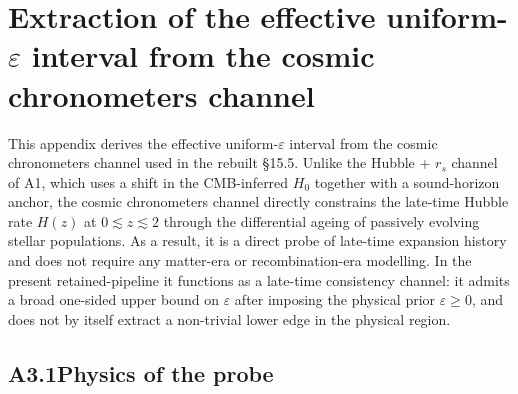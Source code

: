 %
%
%
%

\section{Extraction of the effective uniform-$\varepsilon$ interval
from the cosmic chronometers channel}
\label{app:eps_extraction_cc}

This appendix derives the effective uniform-$\varepsilon$ interval
from the cosmic chronometers channel used in the rebuilt \S15.5.
Unlike the Hubble + $r_s$ channel of A1, which uses a shift in the
CMB-inferred $H_0$ together with a sound-horizon anchor, the
cosmic chronometers channel directly constrains the late-time
Hubble rate $H(z)$ at $0 \lesssim z \lesssim 2$ through the
differential ageing of passively evolving stellar populations. As
a result, it is a direct probe of late-time expansion history and
does not require any matter-era or recombination-era modelling. In
the present retained-pipeline it functions as a late-time
consistency channel: it admits a broad one-sided upper bound on
$\varepsilon$ after imposing the physical prior
$\varepsilon \geq 0$, and does not by itself extract a non-trivial
lower edge in the physical region.

\subsection*{A3.1\quad Physics of the probe}

